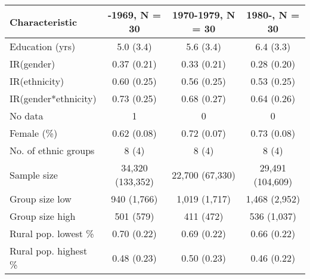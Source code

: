 
\begin{tabular}{lccc}
\toprule
\textbf{Characteristic} & \textbf{-1969}, N = 30 & \textbf{1970-1979}, N = 30 & \textbf{1980-}, N = 30\\
\midrule
Education (yrs) & 5.0 (3.4) & 5.6 (3.4) & 6.4 (3.3)\\
IR(gender) & 0.37 (0.21) & 0.33 (0.21) & 0.28 (0.20)\\
IR(ethnicity) & 0.60 (0.25) & 0.56 (0.25) & 0.53 (0.25)\\
IR(gender*ethnicity) & 0.73 (0.25) & 0.68 (0.27) & 0.64 (0.26)\\
\hspace{1em}No data & 1 & 0 & 0\\
Female (\%) & 0.62 (0.08) & 0.72 (0.07) & 0.73 (0.08)\\
No. of ethnic groups & 8 (4) & 8 (4) & 8 (4)\\
Sample size & 34,320 (133,352) & 22,700 (67,330) & 29,491 (104,609)\\
Group size low & 940 (1,766) & 1,019 (1,717) & 1,468 (2,952)\\
Group size high & 501 (579) & 411 (472) & 536 (1,037)\\
Rural pop. lowest \% & 0.70 (0.22) & 0.69 (0.22) & 0.66 (0.22)\\
Rural pop. highest \% & 0.48 (0.23) & 0.50 (0.23) & 0.46 (0.22)\\
\bottomrule
\end{tabular}
